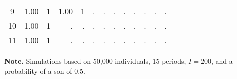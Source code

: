 \documentclass[12pt,letterpaper]{article}
\begin{document}
\begin{table}[!htp]
\begin{threeparttable}
\begin{tabular}{@{} c D{.}{.}{1.2} D{.}{.}{2.0} D{.}{.}{1.2} D{.}{.}{2.0} D{.}{.}{1.2} D{.}{.}{2.0} D{.}{.}{1.2} D{.}{.}{2.0} D{.}{.}{1.2} D{.}{.}{2.0} D{.}{.}{1.2} D{.}{.}{2.0} @{}}
 9             &  1.00 &     1 &  1.00 &     1 &     . &     . &     . &     . &     . &     . &     . &     . \\
 10            &  1.00 &     1 &     . &     . &     . &     . &     . &     . &     . &     . &     . &     . \\
 11            &  1.00 &     1 &     . &     . &     . &     . &     . &     . &     . &     . &     . &     . \\
\bottomrule
\end{tabular}
\begin{tablenotes} \tiny
\item \hspace*{-0.5em} \textbf{Note.} Simulations based on  50,000 individuals, 15 periods, $ I = 200 $,
 and a probability of a son of 0.5.
\end{tablenotes}
\end{threeparttable}
\normalsize
\end{table}
\end{document}
